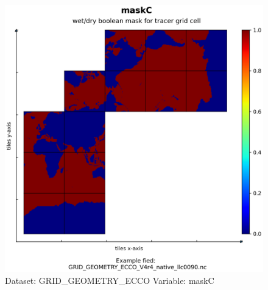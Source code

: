 \begin{figure}[H]
\centering
\includegraphics[width=\textwidth]{../images/plots/native_plots_coords/Geometry_Parameters_for_the_Lat-Lon-Cap_90_(llc90)_Native_Model_Grid_(Version_4_Release_4)/maskC.png}
\caption{Dataset: GRID\_GEOMETRY\_ECCO Variable: maskC}
\label{tab:table-GRID_GEOMETRY_ECCO_maskC-Plot}
\end{figure}
\pagebreak
